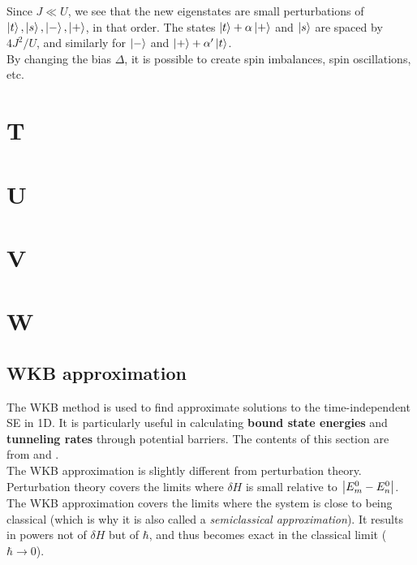 \documentclass{book}
\theoremstyle{definition}
\newcommand{\al}{\alpha}
\begin{document}
Since $J \ll U$, we see that the new eigenstates are small perturbations of $\ket{t},\ket{s},\ket{-},\ket{+}$, in that order. The states $\ket{t}+\al\ket{+}$ and $\ket{s}$ are spaced by $4J^2/U$, and similarly for $\ket{-}$ and $\ket{+}+ \al'\ket{t}$.  \\



By changing the bias $\Delta$, it is possible to create spin imbalances, spin oscillations, etc. 











\chapter*{T}
\chapter*{U}
\chapter*{V}
\chapter*{W}


\section*{WKB approximation}

The WKB method is used to find approximate solutions to the time-independent SE in 1D. It is particularly useful in calculating \textbf{bound state energies} and \textbf{tunneling rates} through potential barriers.  The contents of this section are from \cite{harrow8} and \cite{griffiths2018introduction}. \\



The WKB approximation is slightly different from perturbation theory. Perturbation theory covers the limits where $\delta H $ is small relative to $\abs{E_m^0 - E_n^0}$. The WKB approximation covers the limits where the system is close to being classical (which is why it is also called a \textit{semiclassical approximation}). It results in powers not of $\delta H$ but of $\hbar$, and thus becomes exact in the classical limit ($\hbar \to 0$). \\
\end{document}
